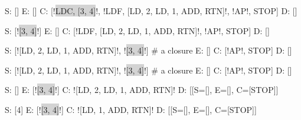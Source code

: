 \documentclass[professionalFonts]{beamer}
\makeatletter
\newcommand\pythonstyle{\lstset{
xleftmargin=1em,
framextopmargin=2em,
framexbottommargin=2em,
showspaces=false,
showtabs=false,
showstringspaces=false,
tabsize=4,
basicstyle=\ttfamily\small\setstretch{1},
backgroundcolor=\color{Background},
language=python,
commentstyle=\color{Comments}\slshape,
stringstyle=\color{Strings},
morecomment=[s][\color{Strings}]{"""}{"""},
morecomment=[s][\color{Strings}]{'''}{'''},
morekeywords={import,from,class,def,for,while,if,is,in,elif,else,not,and,or,print,break,continue,return,True,False,None,access,as,,del,except,exec,finally,global,import,lambda,pass,print,raise,try,assert},
keywordstyle={\color{Keywords}\bfseries},
morekeywords={[2]@invariant},
keywordstyle={[2]\color{Decorators}\slshape},
emph={self},
emphstyle={\color{self}\slshape},
%
}}
\newcommand\pythoninline[1]{{\pythonstyle\lstinline!#1!}}
\makeatother
\begin{document}
%
%
%
%
%
%
%

\begin{frame}[fragile]
\begin{python}[escapechar=!]
S: []
E: []
C: [!\colorbox{lightgray}{LDC, [3, 4]}!, !\colorbox{mintgreen}{LDF, [LD, 2, LD, 1, ADD, RTN]}!, !\colorbox{lemon}{AP}!, STOP]
D: []
\end{python}

\begin{python}[escapechar=!]
S: [!\colorbox{lightgray}{[3, 4]}!]
E: []
C: [!\colorbox{mintgreen}{LDF, [LD, 2, LD, 1, ADD, RTN]}!, !\colorbox{lemon}{AP}!, STOP]
D: []
\end{python}

\begin{python}[escapechar=!]
S: [!\colorbox{mintgreen}{[LD, 2, LD, 1, ADD, RTN]}!, !\colorbox{lightgray}{[3, 4]}!]  # a closure
E: []
C: [!\colorbox{lemon}{AP}!, STOP]
D: []
\end{python}
\end{frame}

\begin{frame}[fragile]

\begin{python}[escapechar=!]
S: [!\colorbox{mintgreen}{[LD, 2, LD, 1, ADD, RTN]}!, !\colorbox{lightgray}{[3, 4]}!]  # a closure
E: []
C: [!\colorbox{lemon}{AP}!, STOP]
D: []
\end{python}

\begin{python}[escapechar=!]
S: []
E: [!\colorbox{lightgray}{[3, 4]}!]
C: !\colorbox{mintgreen}{[LD, 2, LD, 1, ADD, RTN]}!
D: [[S=[], E=[], C=[STOP]]
\end{python}

\begin{python}[escapechar=!]
S: [4]
E: [!\colorbox{lightgray}{[3, 4]}!]
C: !\colorbox{mintgreen}{[LD, 1, ADD, RTN]}!
D: [[S=[], E=[], C=[STOP]]
\end{python}
\end{frame}
\end{document}
